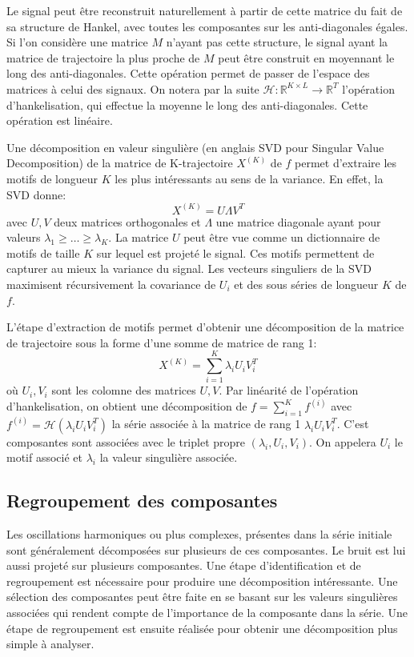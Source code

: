 \documentclass{gretsi}
\def\HH{\mathcal H}
\newcommand{\R}{\mathbb R}
\begin{document}
Le signal peut être reconstruit naturellement à partir de cette matrice du fait de sa structure de Hankel, avec toutes les composantes sur les anti-diagonales égales. Si l'on considère une matrice $M$ n'ayant pas cette structure, le signal ayant la matrice de trajectoire la plus proche de $M$ peut être construit en moyennant le long des anti-diagonales. Cette opération permet de  passer de l'espace des matrices à celui des signaux. On notera par la suite $\HH: \R^{K\times L} \to \R^T$ l'opération d'hankelisation, qui effectue la moyenne le long des anti-diagonales. Cette opération est linéaire.


Une décomposition en valeur singulière (en anglais SVD pour Singular Value Decomposition) de la matrice de K-trajectoire $X^{(K)}$ de $f$ permet d'extraire les motifs de longueur $K$ les plus intéressants au sens de la variance. En effet, la SVD donne: 
$$X^{(K)} = U \Lambda V^T
$$ avec $U, V$ deux matrices orthogonales et $\Lambda$ une matrice diagonale ayant pour valeurs $\lambda_1\ge \dots\ge \lambda_K$. La matrice $U$ peut être vue comme un dictionnaire de motifs de taille $K$ sur lequel est projeté le signal. Ces motifs permettent de capturer au mieux la variance du signal. Les vecteurs singuliers de la SVD maximisent récursivement la covariance de $U_i$ et des sous séries de longueur $K$ de $f$.



L'étape d'extraction de motifs permet d'obtenir une décomposition de la matrice de trajectoire sous la forme d'une somme de matrice de rang 1:$$
X^{(K)} = \sum_{i=1}^K \lambda_i U_iV_i^T 
$$où  $U_i, V_i$ sont les colomne des matrices $U, V$. Par linéarité de l'opération d'hankelisation, on obtient une décomposition de $f = \sum_{i=1}^K f^{(i)}$ avec $f^{(i)} = \HH(\lambda_iU_iV_i^T)$ la série associée à la matrice de rang 1 $\lambda_iU_iV_i^T$. C'est composantes sont associées avec le triplet propre $(\lambda_i, U_i, V_i)$. On appelera $U_i$ le motif associé et $\lambda_i$ la valeur singulière associée.


\subsection{Regroupement des composantes}
\label{sub:grp}

Les oscillations harmoniques ou plus complexes, présentes dans la série initiale sont généralement décomposées sur plusieurs de ces composantes. Le bruit est lui aussi projeté sur plusieurs composantes. Une étape d'identification et de regroupement est nécessaire pour produire une décomposition intéressante. Une sélection des composantes peut être faite en se basant sur les valeurs singulières associées qui rendent compte de l'importance de la composante dans la série. Une étape de regroupement est ensuite réalisée pour obtenir une décomposition plus simple à analyser.
\end{document}
